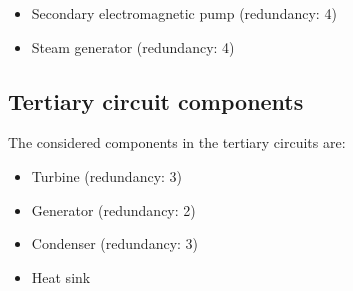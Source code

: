 \begin{itemize}
\item Secondary electromagnetic pump (redundancy: 4)
\item Steam generator (redundancy: 4)
\end{itemize}


\subsection{Tertiary circuit components}
\label{subsec2:tertiary}

The considered components in the tertiary circuits are:

\begin{itemize}
\item Turbine (redundancy: 3)
\item Generator (redundancy: 2)
\item Condenser (redundancy: 3)
\item Heat sink
\end{itemize}
